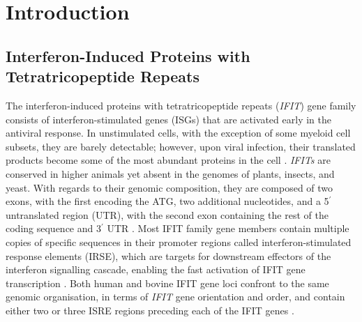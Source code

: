 \chapter{Introduction} \label{ch:Introduction}
\section{Interferon-Induced Proteins with Tetratricopeptide Repeats} \label{sec:Interferon-Induced Proteins with Tetratricopeptide Repeats}
The interferon-induced proteins with tetratricopeptide repeats (\textit{IFIT}) gene family consists of interferon-stimulated genes (ISGs) that are activated early in the antiviral response. In unstimulated cells, with the exception of some myeloid cell subsets, they are barely detectable; however, upon viral infection, their translated products become some of the most abundant proteins in the cell \cite{Diamond2013TheProteins}. \textit{IFITs} are conserved in higher animals yet absent in the genomes of plants, insects, and yeast. With regards to their genomic composition, they are composed of two exons, with the first encoding the ATG, two additional nucleotides, and a 5$^{\prime}$ untranslated region (UTR), with the second exon containing the rest of the coding sequence and 3$^{\prime}$ UTR \cite{deVeer1998IFI60/ISG60/IFIT4Genes}. Most IFIT family gene members contain multiple copies of specific sequences in their promoter regions called interferon-stimulated response elements (IRSE), which are targets for downstream effectors of the interferon signalling cascade, enabling the fast activation of IFIT gene transcription \cite{Lou2009IFR-9/STAT2STAT1}. Both human and bovine IFIT gene loci confront to the same genomic organisation, in terms of \textit{IFIT} gene orientation and order, and contain either two or three ISRE regions preceding each of the IFIT genes \cite{Liu2013Lineage-SpecificFamily}.

